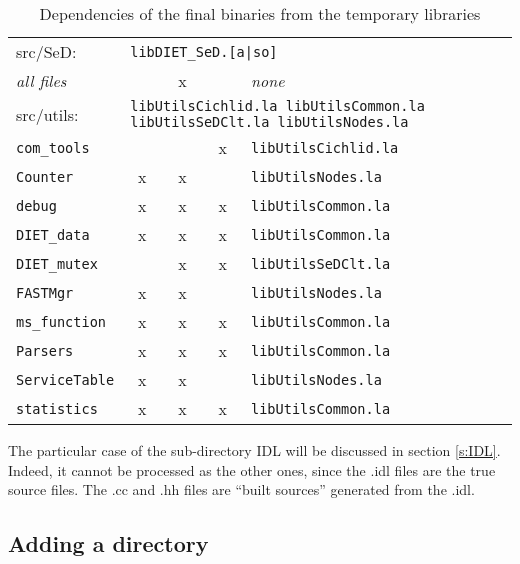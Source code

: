 \begin{table}[h]
\begin{tabular}[c]{|l|c|c|c|l|}

  \multicolumn{1}{|l}{\textsf{src/SeD}:} &
  \multicolumn{4}{l|}{\texttt{libDIET\_SeD.[a|so]}}\\[5pt]

  \textit{all files}              &   & x &   & \emph{none}\\[5pt]
  \hline


  \multicolumn{1}{|l}{\textsf{src/utils}:} &
  \multicolumn{4}{l|}{\texttt{libUtilsCichlid.la libUtilsCommon.la 
                             libUtilsSeDClt.la  libUtilsNodes.la}}\\[5pt]

  \texttt{com\_tools}             &   &   & x & \texttt{libUtilsCichlid.la}\\
  \texttt{Counter}                & x & x &   & \texttt{libUtilsNodes.la}\\
  \texttt{debug}                  & x & x & x & \texttt{libUtilsCommon.la}\\
  \texttt{DIET\_data}             & x & x & x & \texttt{libUtilsCommon.la}\\
  \texttt{DIET\_mutex}            &   & x & x & \texttt{libUtilsSeDClt.la}\\
  \texttt{FASTMgr}                & x & x &   & \texttt{libUtilsNodes.la}\\
  \texttt{ms\_function}           & x & x & x & \texttt{libUtilsCommon.la}\\
  \texttt{Parsers}                & x & x & x & \texttt{libUtilsCommon.la}\\
  \texttt{ServiceTable}           & x & x &   & \texttt{libUtilsNodes.la}\\
  \texttt{statistics}             & x & x & x & \texttt{libUtilsCommon.la}\\[5pt]
  \hline
 

 \end{tabular}
 \caption{Dependencies of the final binaries from the temporary libraries}
 \label{t:dep}
\end{table}


\noindent
{} The particular case of the sub-directory \textsf{IDL} will be
discussed in section \ref{s:IDL}. Indeed, it cannot be processed as the other
ones, since the \textsf{.idl} files are the true source files. The \textsf{.cc}
and \textsf{.hh} files are ``built sources'' generated from the \textsf{.idl}.



\subsection{Adding a directory}

